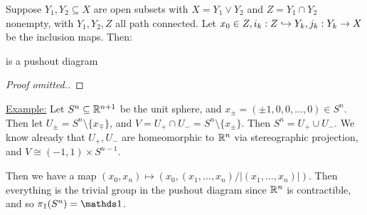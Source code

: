 \documentclass[10pt,a4paper]{article}
\begin{document}
\begin{theorem}
Suppose $Y_1, Y_2 \subseteq X$ are open subsets with $X = Y_1 \vee Y_2$ and $ Z = Y_1 \cap Y_2$ nonempty, with $Y_1, Y_2, Z$ all path connected. Let $x_0 \in Z, i_k :Z\hookrightarrow Y_k, j_k:Y_k \to X$ be the inclusion maps. Then:
\begin{center}
\end{center}
is a pushout diagram
\end{theorem}
\begin{proof}[Proof omitted.]
\end{proof}
\underline{Example:} Let $S^n \subseteq \mathbb{R}^{n+1}$ be the unit sphere, and $x_{\pm} = (\pm 1, 0, 0, \ldots, 0) \in S^n$. Then let $U_{\pm} = S^n \setminus \{x_{\mp}\}$, and $V = U_{+} \cap U_{-} = S^n \setminus \{x_{\pm}\}$. Then $S^n = U_+ \cup U_-$. We know already that $U_+, U_-$ are homeomorphic to $\mathbb{R}^n$ via stereographic projection, and $V \cong (-1, 1) \times S^{n-1}$.

Then we have a map $(x_0, x_n) \mapsto (x_0, (x_1,\ldots, x_n)/|(x_1, \ldots, x_n)|)$. Then everything is the trivial group in the pushout diagram since $\mathbb{R}^n$ is contractible, and so $\pi_1(S^n) = \one$.
\end{document}
